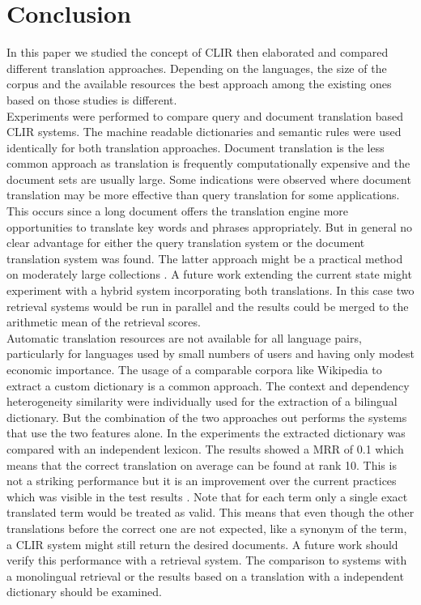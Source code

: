 \documentclass[journal]{IEEEtran}
\begin{document}
\section{Conclusion}
In this paper we studied the concept of CLIR then elaborated and compared different translation approaches.
Depending on the languages, the size of the corpus and the available resources the best approach among the existing ones based on those studies is different.
\mbox{}\\

Experiments were performed to compare query and document translation based CLIR systems.
The machine readable dictionaries and semantic rules were used identically for both translation approaches.
Document translation is the less common approach as translation is frequently computationally expensive and the document sets are usually large.
Some indications were observed where document translation may be more effective than query translation for some applications.
This occurs since a long document offers the translation engine more opportunities to translate key words and phrases appropriately.
But in general no clear advantage for either the query translation system or the document translation system was found.
The latter approach might be a practical method on moderately large collections \cite{oard97b}.
A future work extending the current state might experiment with a hybrid system incorporating both translations.
In this case two retrieval systems would be run in parallel and the results could be merged to the arithmetic mean of the retrieval scores.
\mbox{}\\

Automatic translation resources are not available for all language pairs, particularly for languages used by small numbers of users and having only modest economic importance.
The usage of a comparable corpora like Wikipedia to extract a custom dictionary is a common approach.
The context and dependency heterogeneity similarity were individually used for the extraction of a bilingual dictionary.
But the combination of the two approaches out performs the systems that use the two features alone.
In the experiments the extracted dictionary was compared with an independent lexicon.
The results showed a MRR of 0.1 which means that the correct translation on average can be found at rank 10.
This is not a striking performance but it is an improvement over the current practices which was visible in the test results \cite{yu09}.
Note that for each term only a single exact translated term would be treated as valid.
This means that even though the other translations before the correct one are not expected, like a synonym of the term, a CLIR system might still return the desired documents.
A future work should verify this performance with a retrieval system.
The comparison to systems with a monolingual retrieval or the results based on a translation with a independent dictionary should be examined.
\mbox{}\\
\end{document}
